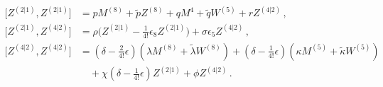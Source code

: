\begin{equation}
\label{e:standardZZansatz}
\begin{aligned}
{}\big[Z^{(2|1)}, Z^{(2|1)}\big] &= p M^{{(8)}} + \tilde{p} Z^{{(8)}} + q M^{4} + \tilde{q} W^{(5)} + r Z^{(4|2)} \, ,\\[1ex]
{}\big[Z^{(2|1)}, Z^{(4|2)}\big] &= 
  \rho \Big( Z^{(2|1)} - \frac{1}{4!} \epsilon_8 Z^{(2|1)}\Big)
  +\sigma \epsilon_5 Z^{(4|2)}\, ,\\[1ex]
{}\big[Z^{(4|2)}, Z^{(4|2)}\big] &=  
   (\delta - \tfrac{2}{4!}\epsilon ) (\lambda M^{(8)} + \tilde\lambda W^{(8)})
 + (\delta - \tfrac{1}{4!}\epsilon ) (\kappa M^{(5)} + \tilde\kappa W^{(5)} )\\[1ex]
 &\quad + \chi (\delta - \tfrac{1}{4!}\epsilon) Z^{(2|1)}
 + \phi Z^{(4|2)}\, .
\end{aligned}
\end{equation}

